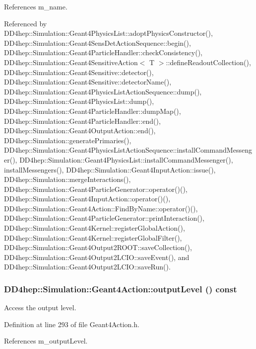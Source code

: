 References m\_\-name.

Referenced by DD4hep::Simulation::Geant4PhysicsList::adoptPhysicsConstructor(), DD4hep::Simulation::Geant4SensDetActionSequence::begin(), DD4hep::Simulation::Geant4ParticleHandler::checkConsistency(), DD4hep::Simulation::Geant4SensitiveAction$<$ T $>$::defineReadoutCollection(), DD4hep::Simulation::Geant4Sensitive::detector(), DD4hep::Simulation::Geant4Sensitive::detectorName(), DD4hep::Simulation::Geant4PhysicsListActionSequence::dump(), DD4hep::Simulation::Geant4PhysicsList::dump(), DD4hep::Simulation::Geant4ParticleHandler::dumpMap(), DD4hep::Simulation::Geant4ParticleHandler::end(), DD4hep::Simulation::Geant4OutputAction::end(), DD4hep::Simulation::generatePrimaries(), DD4hep::Simulation::Geant4PhysicsListActionSequence::installCommandMessenger(), DD4hep::Simulation::Geant4PhysicsList::installCommandMessenger(), installMessengers(), DD4hep::Simulation::Geant4InputAction::issue(), DD4hep::Simulation::mergeInteractions(), DD4hep::Simulation::Geant4ParticleGenerator::operator()(), DD4hep::Simulation::Geant4InputAction::operator()(), DD4hep::Simulation::Geant4Action::FindByName::operator()(), DD4hep::Simulation::Geant4ParticleGenerator::printInteraction(), DD4hep::Simulation::Geant4Kernel::registerGlobalAction(), DD4hep::Simulation::Geant4Kernel::registerGlobalFilter(), DD4hep::Simulation::Geant4Output2ROOT::saveCollection(), DD4hep::Simulation::Geant4Output2LCIO::saveEvent(), and DD4hep::Simulation::Geant4Output2LCIO::saveRun().\hypertarget{class_d_d4hep_1_1_simulation_1_1_geant4_action_a24f50b96085f6af082b8aaef3813e218}{
\subsubsection[{outputLevel}]{ DD4hep::Simulation::Geant4Action::outputLevel () const}}
\label{class_d_d4hep_1_1_simulation_1_1_geant4_action_a24f50b96085f6af082b8aaef3813e218}


Access the output level. 

Definition at line 293 of file Geant4Action.h.

References m\_\-outputLevel.


